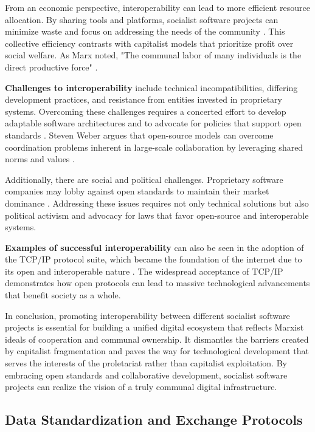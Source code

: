 \begin{refsection}
From an economic perspective, interoperability can lead to more efficient resource allocation. By sharing tools and platforms, socialist software projects can minimize waste and focus on addressing the needs of the community \cite[pp.~706--707]{Marx2008}. This collective efficiency contrasts with capitalist models that prioritize profit over social welfare. As Marx noted, "The communal labor of many individuals is the direct productive force" \cite[pp.~199]{Marx2008}.

\textbf{Challenges to interoperability} include technical incompatibilities, differing development practices, and resistance from entities invested in proprietary systems. Overcoming these challenges requires a concerted effort to develop adaptable software architectures and to advocate for policies that support open standards \cite[pp.~113--115]{Weber2004}. Steven Weber argues that open-source models can overcome coordination problems inherent in large-scale collaboration by leveraging shared norms and values \cite[pp.~156--158]{Weber2004}.

Additionally, there are social and political challenges. Proprietary software companies may lobby against open standards to maintain their market dominance \cite[pp.~62--64]{Lessig2006}. Addressing these issues requires not only technical solutions but also political activism and advocacy for laws that favor open-source and interoperable systems.

\textbf{Examples of successful interoperability} can also be seen in the adoption of the TCP/IP protocol suite, which became the foundation of the internet due to its open and interoperable nature \cite[pp.~45--47]{Leiner2009}. The widespread acceptance of TCP/IP demonstrates how open protocols can lead to massive technological advancements that benefit society as a whole.

In conclusion, promoting interoperability between different socialist software projects is essential for building a unified digital ecosystem that reflects Marxist ideals of cooperation and communal ownership. It dismantles the barriers created by capitalist fragmentation and paves the way for technological development that serves the interests of the proletariat rather than capitalist exploitation. By embracing open standards and collaborative development, socialist software projects can realize the vision of a truly communal digital infrastructure.

\subsection{Data Standardization and Exchange Protocols}


\end{refsection}
